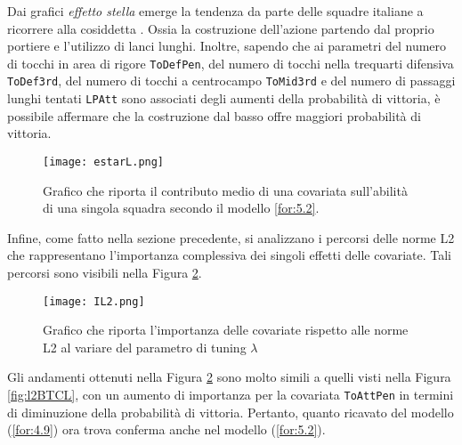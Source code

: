 Dai grafici \emph{effetto stella} emerge la tendenza da parte delle squadre italiane a ricorrere alla cosiddetta \textit{\cite{costrdalbasso}}. Ossia la costruzione dell'azione partendo dal proprio portiere e l'utilizzo di lanci lunghi. Inoltre, sapendo che ai parametri del numero di tocchi in area di rigore \texttt{ToDefPen}, del numero di tocchi nella trequarti difensiva \texttt{ToDef3rd}, del numero di tocchi a centrocampo \texttt{ToMid3rd} e del numero di passaggi lunghi tentati \texttt{LPAtt} sono associati degli aumenti della probabilità di vittoria, è possibile affermare che la costruzione dal basso offre maggiori probabilità di vittoria.\\
\begin{figure}[!htbp]
	\begin{center}
		\texttt{[image: estarL.png]}
		\caption{Grafico che riporta il contributo medio di una covariata sull'abilità di una singola squadra secondo il modello \ref{for:5.2}.} \label{fig:effstar3}
	\end{center}
\end{figure}
Infine, come fatto nella sezione precedente, si analizzano i percorsi delle norme L2 che rappresentano l'importanza complessiva dei singoli effetti delle covariate. Tali percorsi sono visibili nella Figura \ref{fig:IL2}.

\begin{figure}[!htbp]
	\begin{center}
		\texttt{[image: IL2.png]}
		\caption{Grafico che riporta l'importanza delle covariate rispetto alle norme L2 al variare del parametro di tuning $\lambda$} \label{fig:IL2}
	\end{center}
\end{figure}

Gli andamenti ottenuti nella Figura \ref{fig:IL2} sono molto simili a quelli visti nella Figura \ref{fig:l2BTCL}, con un aumento di importanza per la covariata \texttt{ToAttPen} in termini di diminuzione della probabilità di vittoria. Pertanto, quanto ricavato del modello (\ref{for:4.9}) ora trova conferma anche nel modello (\ref{for:5.2}).
\pagebreak

